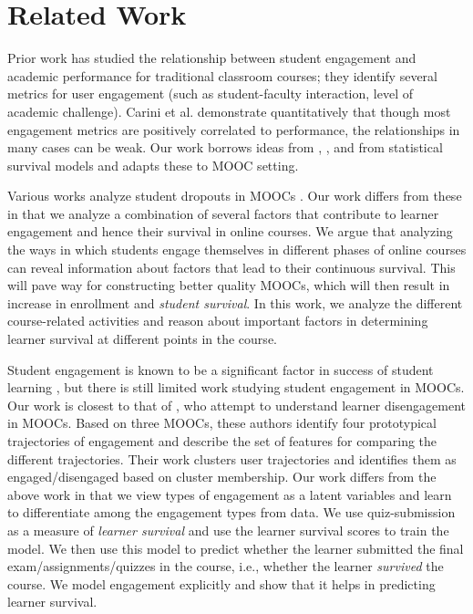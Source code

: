 \section{Related Work}
\label{sec:relatedwork}

Prior work \cite{kuh,carini06} has studied the relationship between student engagement and academic performance for traditional classroom courses; they identify several metrics for user engagement (such as student-faculty interaction, level of academic challenge). Carini et al. demonstrate quantitatively that though most engagement metrics are positively correlated to performance, the relationships in many cases can be weak. Our work borrows ideas from \citeauthor{kuh} , \citeauthor{carini06} , and from statistical survival models \cite{richards:12} and adapts these to MOOC setting.

Various works analyze student dropouts in MOOCs \cite{palade,clow:13,balakrishnan:13,diyi13}. Our work differs from these in that we analyze a combination of several factors that contribute to learner engagement and hence their survival in online courses. We argue that analyzing the ways in which students engage themselves in different phases of online courses can reveal information about factors that lead to their continuous survival. This will pave way for constructing better quality MOOCs, which will then result in increase in enrollment and \emph{student survival}. In this work, we analyze the different course-related activities and reason about important factors in determining learner survival at different points in the course.

Student engagement is known to be a significant factor in success of student learning \cite{kuh}, but there is still limited work studying student engagement in MOOCs. Our work is closest to that of \citeauthor{kizilcec:13} , who attempt to understand learner disengagement in MOOCs. Based on three MOOCs, these authors identify four prototypical trajectories of engagement and describe the set of features for comparing the different trajectories. Their work clusters user trajectories and identifies them as engaged/disengaged based on cluster membership. Our work differs from the above work in that we view types of engagement as a latent variables and learn to differentiate among the engagement types from data. We use quiz-submission as a measure of \emph{learner survival} and use the learner survival scores to train the model. We then use this model to predict whether the learner submitted the final exam/assignments/quizzes in the course, i.e., whether the learner \emph{survived} the course. We model engagement explicitly and show that it helps in predicting learner survival.



 
